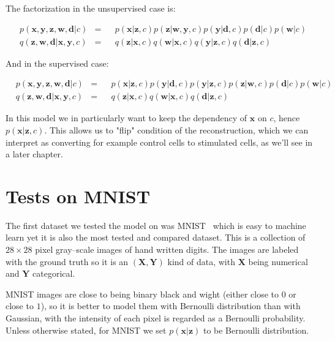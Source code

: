 \documentclass[11pt, a4paper]{report}
\theoremstyle{plain}
\theoremstyle{definition}
\theoremstyle{remark}
\newcommand{\X}{\mathbf{X}}
\newcommand{\x}{\mathbf{x}}
\newcommand{\z}{\mathbf{z}}
\newcommand{\Y}{\mathbf{Y}}
\newcommand{\y}{\mathbf{y}}
\newcommand{\w}{\mathbf{w}}
\newcommand{\dd}{\mathbf{d}}
\begin{document}
The factorization in the unsupervised case is:

\begin{equation}
\begin{aligned}
&p(\x, \y, \z, \w, \dd | c) &=& 
&p(\x | \z, c) p(\z | \w, \y, c) p(\y | \dd, c) p(\dd | c) p(\w | c) \\
&q(\z, \w, \dd | \x, \y, c) &=& 
&q(\z | \x, c) q(\w | \x, c) q(\y | \z, c) q(\dd | \z, c)
\label{eq:cgmmfact_unsupervised.}
\end{aligned}
\end{equation}

And in the supervised case:

\begin{equation}
\begin{aligned}
&p(\x, \y, \z, \w, \dd | c) &=& 
&p(\x | \z, c) p(\y | \dd, c) p(\y | \z, c) p(\z | \w, c) p(\dd | c) p(\w | c) \\
&q(\z, \w, \dd | \x, \y, c) &=& 
&q(\z | \x, c) q(\w | \x, c) q(\dd | \z, c)
\label{eq:cgmmfact_supervised}
\end{aligned}
\end{equation}

In this model we in particularly want to keep the dependency of $\x$ on $c$, hence
$p(\x | \z, c)$. This allows us to "flip" condition of the reconstruction,
which we can interpret as converting for example control cells to stimulated
cells, as we'll see in a later chapter.

\chapter{Tests on MNIST}

The first dataset we tested the model on was MNIST~\cite{mnist} which is 
easy to machine learn yet it is also the most tested and compared dataset.
This is a collection of $28 \times 28$ pixel gray--scale images of hand written 
digits. The images are labeled with the ground truth so it is an $(\X,\Y)$ kind
of data, with $\X$ being numerical and $\Y$ categorical.

MNIST images are close to being binary black and wight (either close to $0$ or
close to $1$), so it is better to model them with Bernoulli distribution than
with Gaussian, with the intensity of each pixel is regarded as a Bernoulli
probability.
Unless otherwise stated, for MNIST we set $p(\x | \z)$ to be Bernoulli
distribution.
\end{document}
